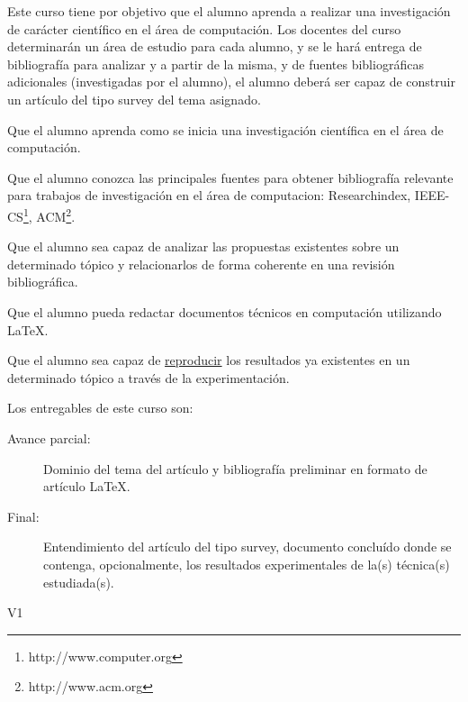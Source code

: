 \begin{syllabus}


\begin{justification}
Este curso tiene por objetivo que el alumno aprenda a realizar una
investigación de carácter científico en el área de computación. Los docentes del curso determinarán un área de estudio para cada alumno, y se le hará entrega de bibliografía para analizar y a partir de la misma, y de fuentes bibliográficas adicionales (investigadas por el alumno), el alumno deberá ser capaz de construir un artículo del tipo survey del tema asignado.
\end{justification}

\begin{goals}
\item Que el alumno aprenda como se inicia una investigación científica en el área de computación.
\item Que el alumno conozca las principales fuentes para obtener bibliografía relevante para trabajos de investigación en el área de computacion: Researchindex, IEEE-CS\footnote{http://www.computer.org}, ACM\footnote{http://www.acm.org}.
\item Que el alumno sea capaz de analizar las propuestas existentes sobre un determinado tópico y relacionarlos de forma coherente en una revisión bibliográfica.
\item Que el alumno pueda redactar documentos técnicos en computación utilizando \LaTeX.
\item Que el alumno sea capaz de \underline{reproducir} los resultados ya existentes en un determinado tópico a través de la experimentación.
\item Los entregables de este curso son:
	\begin{description}
	\item [Avance parcial:] Dominio del tema del artículo y bibliografía preliminar en formato de artículo \LaTeX.
	\item [Final:] Entendimiento del artículo del tipo survey, documento concluído donde se contenga, opcionalmente, 
	      los resultados experimentales de la(s) técnica(s) estudiada(s).
	\end{description}
\end{goals}

\begin{outcomes}{V1}
  \item {}
  \item {}
  \item {}
  \item {}
  \item {}
  \item {}
\end{outcomes}


\end{syllabus}
